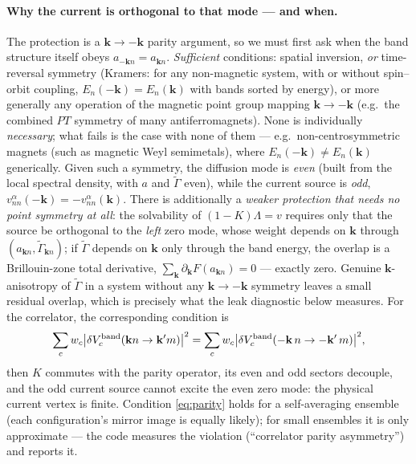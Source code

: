\documentclass[11pt]{article}
\newcommand{\vk}{\mathbf{k}}
\newcommand{\Gam}{\Gamma}
\begin{document}
\paragraph{Why the current is orthogonal to that mode --- and when.}
The protection is a $\vk\to-\vk$ parity argument, so we must first ask
when the band structure itself obeys $a_{-\vk n}=a_{\vk n}$.
\emph{Sufficient} conditions: spatial inversion, \emph{or} time-reversal
symmetry (Kramers: for any non-magnetic system, with or without
spin--orbit coupling, $E_n(-\vk)=E_n(\vk)$ with bands sorted by energy),
or more generally any operation of the magnetic point group mapping
$\vk\to-\vk$ (e.g.\ the combined $PT$ symmetry of many
antiferromagnets).  None is individually \emph{necessary}; what fails is
the case with none of them --- e.g.\ non-centrosymmetric magnets (such
as magnetic Weyl semimetals), where $E_n(-\vk)\neq E_n(\vk)$
generically.  Given such a symmetry, the diffusion mode is \emph{even}
(built from the local spectral density, with $a$ and $\tilde\Gam$ even),
while the current source is \emph{odd},
$v^{\alpha}_{nn}(-\vk)=-v^{\alpha}_{nn}(\vk)$.  There is additionally a
\emph{weaker protection that needs no point symmetry at all}: the
solvability of $(1-K)\Lambda=v$ requires only that the source be
orthogonal to the \emph{left} zero mode, whose weight depends on $\vk$
through $(a_{\vk n},\tilde\Gam_{\vk n})$; if $\tilde\Gam$ depends on
$\vk$ only through the band energy, the overlap is a Brillouin-zone
total derivative, $\sum_\vk\partial_\vk F(a_{\vk n})=0$ --- exactly
zero.  Genuine $\vk$-anisotropy of $\tilde\Gam$ in a system without any
$\vk\to-\vk$ symmetry leaves a small residual overlap, which is
precisely what the leak diagnostic below measures.  For the correlator,
the corresponding condition is
\begin{equation}
\sum_c w_c\big|\delta V^{\rm band}_c(\vk n\to\vk'm)\big|^2
=\sum_c w_c\big|\delta V^{\rm band}_c(-\vk\,n\to-\vk'\,m)\big|^2 ,
\label{eq:parity}
\end{equation}
then $K$ commutes with the parity operator, its even and odd sectors
decouple, and the odd current source cannot excite the even zero mode:
the physical current vertex is finite.  Condition \eqref{eq:parity}
holds for a self-averaging ensemble (each configuration's mirror image
is equally likely); for small ensembles it is only approximate --- the
code measures the violation (``correlator parity asymmetry'') and
reports it.
\end{document}

